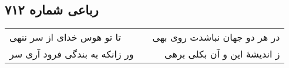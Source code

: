 \begin{center}
\section*{رباعی شماره ۷۱۲}
\label{sec:sh712}
\begin{longtable}{l p{0.5cm} r}
تا تو هوس خدای از سر ننهی
&&
در هر دو جهان نباشدت روی بهی
\\
ور زانکه به بندگی فرود آری سر
&&
ز اندیشهٔ این و آن بکلی برهی
\\
\end{longtable}
\end{center}
